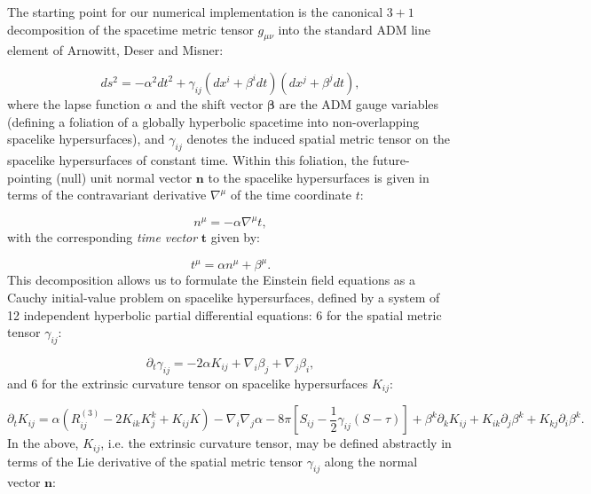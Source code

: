 \documentclass{article}
\begin{document}
The starting point for our numerical implementation is the canonical ${3 + 1}$ decomposition of the spacetime metric tensor ${g_{\mu \nu}}$ into the standard ADM line element of Arnowitt, Deser and Misner\cite{arnowitt}:

\begin{equation}
d s^2 = - \alpha^2 d t^2 + \gamma_{i j} \left( d x^{i} + \beta^{i} dt \right) \left( d x^{j} + \beta^{j} dt \right),
\end{equation}
where the lapse function ${\alpha}$ and the shift vector ${\boldsymbol\beta}$ are the ADM gauge variables (defining a foliation of a globally hyperbolic spacetime into non-overlapping spacelike hypersurfaces), and ${\gamma_{i j}}$ denotes the induced spatial metric tensor on the spacelike hypersurfaces of constant time. Within this foliation, the future-pointing (null) unit normal vector ${\mathbf{n}}$ to the spacelike hypersurfaces is given in terms of the contravariant derivative ${\nabla^{\mu}}$ of the time coordinate $t$:

\begin{equation}
n^{\mu} = - \alpha \nabla^{\mu} t,
\end{equation}
with the corresponding \textit{time vector} ${\mathbf{t}}$ given by:

\begin{equation}
t^{\mu} = \alpha n^{\mu} + \beta^{\mu}.
\end{equation}
This decomposition allows us to formulate the Einstein field equations as a Cauchy initial-value problem on spacelike hypersurfaces, defined by a system of 12 independent hyperbolic partial differential equations: 6 for the spatial metric tensor ${\gamma_{i j}}$:

\begin{equation}
\partial_t \gamma_{i j} = - 2 \alpha K_{i j} + \nabla_{i} \beta_{j} + \nabla_{j} \beta_{i},
\end{equation}
and 6 for the extrinsic curvature tensor on spacelike hypersurfaces ${K_{i j}}$:

\begin{equation}
\partial_t K_{i j} = \alpha \left( R_{i j}^{\left( 3 \right)} - 2 K_{i k} K_{j}^{k} + K_{i j} K \right) - \nabla_{i} \nabla_{j} \alpha - 8 \pi \left[ S_{i j} - \frac{1}{2} \gamma_{i j} \left( S - \tau \right) \right] + \beta^{k} \partial_{k} K_{i j} + K_{i k} \partial_{j} \beta^{k} + K_{k j} \partial_{i} \beta^{k}.
\end{equation}
In the above, ${K_{i j}}$, i.e. the extrinsic curvature tensor, may be defined abstractly in terms of the Lie derivative of the spatial metric tensor ${\gamma_{i j}}$ along the normal vector ${\mathbf{n}}$:
\end{document}
